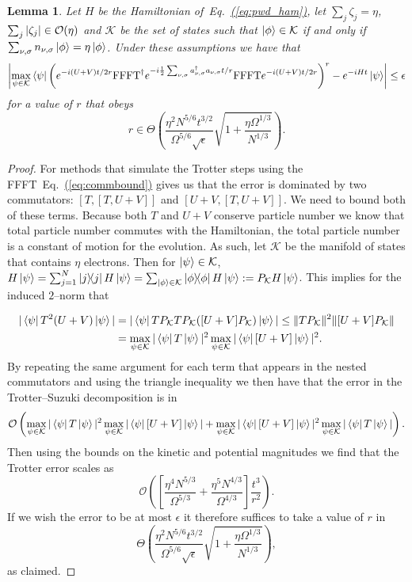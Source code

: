 \documentclass[superscriptaddress,aps,pra,nofootinbib,notitlepage,10pt,longbibliography]{revtex4-1}
\newtheorem{lemma}[theorem]{Lemma}
\newcommand{\eq}[1]{Eq.~\hyperref[eq:#1]{(\ref*{eq:#1})}}
\def\bra#1{\mathinner{\langle{#1}|}}
\def\ket#1{\mathinner{|{#1}\rangle}}
\newcommand{\proj}[1]{\ket{#1}\!\!\bra{#1}}
\begin{document}
\begin{lemma}
Let $H$ be the Hamiltonian of~\eq{pwd_ham}, let $\sum_j \zeta_j = \eta$, $\sum_j |\zeta_j| \in {\cal O}(\eta)$ and $\mathcal{K}$ be the set of states such that $\ket{\phi} \in \mathcal{K}$ if and only if $\sum_{\nu,\sigma} n_{\nu,\sigma} \ket{\phi}=\eta\ket{\phi}$.  Under these assumptions we have that $$\left|\max_{\psi\in \mathcal{K}} \bra{\psi} \left(e^{-i(U+V)t/2r}{\rm FFFT}^\dagger e^{-i\frac{1}{2} \sum_{\nu, \sigma} a_{\nu,\sigma}^\dagger a_{\nu,\sigma} t/r}{\rm FFFT}e^{-i(U+V)t/2r}\right)^r  - e^{-iHt}\ket{\psi}\right|\le \epsilon$$ for a value of $r$ that obeys
$$
r\in{\Theta}\left(\frac{\eta^2 N^{5/6}t^{3/2}}{\Omega^{5/6}\sqrt{\epsilon}}\sqrt{1+\frac{\eta\Omega^{1/3}}{N^{1/3}}} \right).
$$
\end{lemma}
\begin{proof}
For methods that simulate the Trotter steps using the FFFT~\eq{commbound} gives us that the error is dominated by two commutators: $[T,[T,U+V]]$ and $[U+V,[T,U+V]]$.  We need to bound both of these terms.
Because both $T$ and $U+V$ conserve particle number we know that total particle number commutes with the Hamiltonian, the total particle number is a constant of motion for the evolution.  As such, let $\mathcal{K}$ be the manifold of states that contains $\eta$ electrons.  Then for $\ket{\psi}\in\mathcal{K}$, $H\ket{\psi} = \sum_{j=1}^N \proj{j}H\ket{\psi} = \sum_{\ket{\phi}\in \mathcal{K}} \proj{\phi}H\ket{\psi}:=P_{\mathcal{K}} H\ket{\psi}$.  This implies for the induced $2$--norm that

\begin{align}
|\bra{\psi} T^2(U+V) \ket{\psi}|&=| \bra{\psi} TP_{\mathcal{K}} TP_{\mathcal{K}}([U+V]P_{\mathcal{K}}) \ket{\psi}|\le \|TP_{\mathcal{K}}\|^2 \|[U+V]P_{\mathcal{K}}\|\nonumber\\
& = \max_{\psi \in \mathcal{K}}|\bra{\psi}T\ket{\psi}|^2\max_{\psi \in \mathcal{K}}|\bra{\psi}[U+V]\ket{\psi}|^2.
\end{align}
By repeating the same argument for each term that appears in the nested commutators and using the triangle inequality we then have that the error in the Trotter--Suzuki decomposition is in
\begin{equation}
\mathcal{O}\left(\max_{\psi \in \mathcal{K}}|\bra{\psi}T\ket{\psi}|^2\max_{\psi \in \mathcal{K}}|\bra{\psi}[U+V]\ket{\psi}|+\max_{\psi \in \mathcal{K}}|\bra{\psi}[U+V]\ket{\psi}|^2\max_{\psi \in \mathcal{K}}|\bra{\psi}T\ket{\psi}| \right).
\end{equation}
Then using the bounds on the kinetic and potential magnitudes we find that the Trotter error scales as
\begin{equation}
\mathcal{O}\left(\left[\frac{\eta^4N^{5/3}}{\Omega^{5/3}}+\frac{\eta^5N^{4/3}}{\Omega^{4/3}}\right]\frac{t^3}{r^2} \right).
\end{equation}
If we wish the error to be at most $\epsilon$ it therefore suffices to take a value of $r$ in
\begin{equation}
{\Theta}\left(\frac{\eta^2 N^{5/6}t^{3/2}}{\Omega^{5/6}\sqrt{\epsilon}}\sqrt{1+\frac{\eta\Omega^{1/3}}{N^{1/3}}} \right),
\end{equation}
as claimed.
\end{proof}
\end{document}
